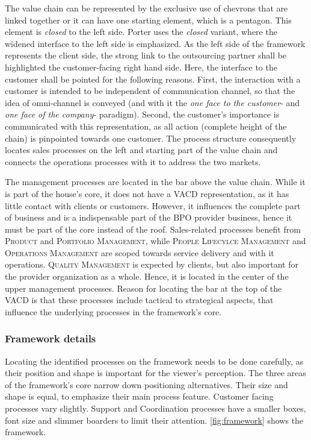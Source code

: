 	
	The value chain can be represented by the exclusive use of chevrons that are linked together or it can have one starting element, which is a pentagon. This element is \textit{closed} to the left side. Porter uses the \textit{closed} variant, where the widened interface to the left side is emphasized. As the left side of the framework represents the client side, the strong link to the outsourcing partner shall be highlighted \wrt the customer-facing right hand side. Here, the interface to the customer shall be pointed for the following reasons. First, the interaction with a customer is intended to be independent of communication channel, so that the idea of omni-channel is conveyed (and with it the \textit{one face to the customer}- and \textit{one face of the company}- paradigm). Second, the customer's importance is communicated with this representation, as all action (complete height of the chain) is pinpointed towards one customer. The  process structure consequently locates sales processes on the left and starting part of the value chain and connects the operations processes with it to address the two markets. 
	
	The management processes are located in the bar above the value chain. While it is part of the house's core, it does not have a \acrshort{VACD} representation, as it has little contact with clients or customers. However, it influences the complete part of business and is a indispensable part of the \acrshort{BPO} provider business, hence it must be part of the core instead of the roof. Sales-related processes benefit from \textsc{Product} and \textsc{Portfolio Management}, while \textsc{People Lifecylce Management} and \textsc{Operations Management} are scoped towards service delivery and with it operations. \textsc{Quality Management} is expected by clients, but also important for the provider organization as a whole. Hence, it is located in the center of the upper management processes. Reason for locating the bar at the top of the \acrshort{VACD} is that these processes include tactical to strategical aspects, that influence the underlying processes in the framework's core. 
	
	\subsubsection{Framework details}
	
	Locating the identified processes on the framework needs to be done carefully, as their position and shape is important for the viewer's perception. The three areas of the framework's core narrow down positioning alternatives. Their size and shape is equal, to emphasize their main process feature. Customer facing processes vary slightly. Support and Coordination processes have a smaller boxes, font size and slimmer boarders to limit their attention. \Fig \ref{fig:framework} shows the framework.
	
